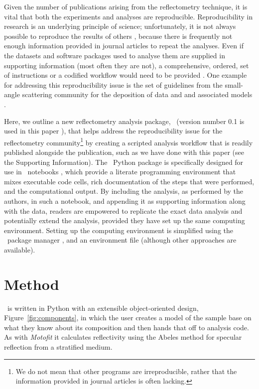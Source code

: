 \documentclass[pdf,preprint]{iucr}
\begin{document}
Given the number of publications arising from the reflectometry technique, it is vital that both the experiments and analyses are reproducible.
Reproducibility in research is an underlying principle of science; unfortunately, it is not always possible to reproduce the results of others \cite{Stark2018}, because there is frequently not enough information provided in journal articles to repeat the analyses. Even if the datasets and software packages used to analyse them are supplied in supporting information (most often they are not), a comprehensive, ordered, set of instructions or a codified workflow would need to be provided \cite{Moeller2017a}.
One example for addressing this reproducibility issue is the set of guidelines from the small-angle scattering community for the deposition of data and and associated models \cite{Trewhella:jc5010}.

Here, we outline a new reflectometry analysis package, \ (version number 0.1 is used in this paper \cite{refnx}), that helps address the reproducibility issue for the reflectometry community\footnote{We do not mean that other programs are irreproducible, rather that the information provided in journal articles is often lacking.} by creating a scripted analysis workflow that is readily published alongside the publication, such as we have done with this paper (see the Supporting Information).
The \ Python package is specifically designed for use in \Jupyter\ notebooks \cite{Kluyver:2016aa}, which provide a literate programming environment that mixes executable code cells, rich documentation of the steps that were performed, and the computational output. By including the analysis, as performed by the authors, in such a notebook, and appending it as supporting information along with the data, readers are empowered to replicate the exact data analysis and potentially extend the analysis, provided they have set up the same computing environment. Setting up the computing environment is simplified using the \conda\ package manager \cite{conda}, and an environment file (although other approaches are available).
\section{Method}

\ is written in Python with an extensible object-oriented design, Figure~\ref{fig:components}, in which the user creates a model of the sample base on what they know about its composition and then hands that off to analysis code. As with \emph{Motofit} \cite{Nelson2006} it calculates reflectivity using the Abeles method \cite{Heavens1955} for specular reflection from a stratified medium.
\end{document}
